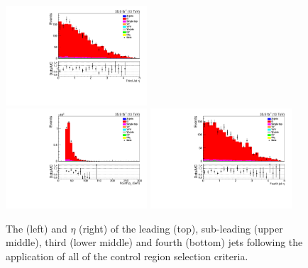 \begin{figure}[h]
\includegraphics[width=0.47\textwidth]{figs/background-estimation/plots/unblinded/ttbar_control/thirdJetEta_SingleTop_wMass_emu.pdf}
\\
\includegraphics[width=0.47\textwidth]{figs/background-estimation/plots/unblinded/ttbar_control/fourthJetPt_SingleTop_wMass_emu.pdf}
\includegraphics[width=0.47\textwidth]{figs/background-estimation/plots/unblinded/ttbar_control/fourthJetEta_SingleTop_wMass_emu.pdf}
\caption{
The \pT (left) and $\eta$ (right) of the leading (top), sub-leading (upper middle), third (lower middle) and fourth (bottom) jets following the application of all of the \ttbar control region selection criteria.
}
\label{fig:ttbar_jetsKinematics_wMass}
\end{figure}